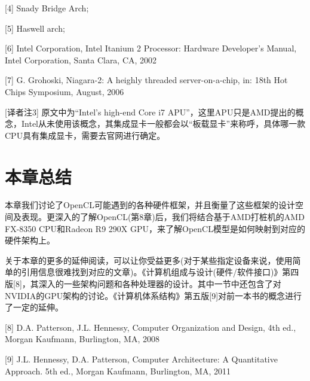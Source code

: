 \begin{myRefs}

[4] Snady Bridge Arch; 

[5] Haswell arch; 

[6] Intel Corporation, Intel Itanium 2 Processor: Hardware Developer's Manual, Intel Corporation, Santa Clara, CA, 2002

[7] G. Grohoski, Niagara-2: A heighly threaded server-on-a-chip, in: 18th Hot Chips Symposium, August, 2006

[译者注3] 原文中为“Intel's high-end Core i7 APU”，这里APU只是AMD提出的概念，Intel从未使用该概念，其集成显卡一般都会以“板载显卡”来称呼，具体哪一款CPU具有集成显卡，需要去官网进行确定。

\end{myRefs}



\section{本章总结}

本章我们讨论了OpenCL可能遇到的各种硬件框架，并且衡量了这些框架的设计空间及表现。更深入的了解OpenCL(第8章)后，我们将结合基于AMD打桩机的AMD FX-8350 CPU和Radeon R9 290X GPU，来了解OpenCL模型是如何映射到对应的硬件架构上。

关于本章的更多的延伸阅读，可以让你受益更多(对于某些指定设备来说，使用简单的引用信息很难找到对应的文章)。《计算机组成与设计(硬件/软件接口)》第四版[8]，其深入的一些架构问题和各种处理器的设计。其中一节中还包含了对NVIDIA的GPU架构的讨论。《计算机体系结构》第五版[9]对前一本书的概念进行了一定的延伸。

\myRefRule

\begin{myRefs}

[8] D.A. Patterson, J.L. Hennessy, Computer Organization and Design, 4th ed., Morgan Kaufmann, Burlington, MA, 2008

[9] J.L. Hennessy, D.A. Patterson, Computer Architecture: A Quantitative Approach. 5th ed., Morgan Kaufmann, Burlington, MA, 2011

\end{myRefs}


